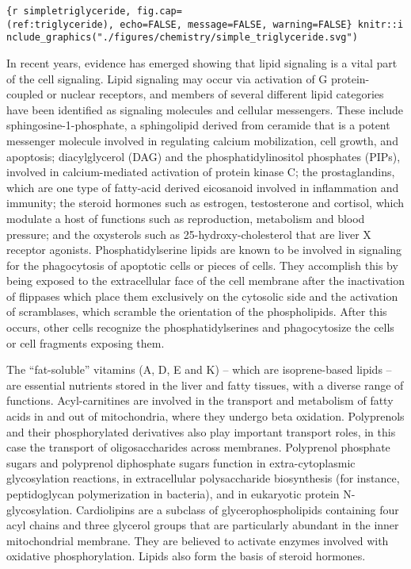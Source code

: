 \texttt{\{r\ simpletriglyceride,\ fig.cap=\textquotesingle{}(ref:triglyceride)\textquotesingle{},\ echo=FALSE,\ message=FALSE,\ warning=FALSE\}\ knitr::include\_graphics("./figures/chemistry/simple\_triglyceride.svg")}

In recent years, evidence has emerged showing that lipid signaling is a
vital part of the cell signaling. Lipid signaling may occur via
activation of G protein-coupled or nuclear receptors, and members of
several different lipid categories have been identified as signaling
molecules and cellular messengers. These include
sphingosine-1-phosphate, a sphingolipid derived from ceramide that is a
potent messenger molecule involved in regulating calcium mobilization,
cell growth, and apoptosis; diacylglycerol (DAG) and the
phosphatidylinositol phosphates (PIPs), involved in calcium-mediated
activation of protein kinase C; the prostaglandins, which are one type
of fatty-acid derived eicosanoid involved in inflammation and immunity;
the steroid hormones such as estrogen, testosterone and cortisol, which
modulate a host of functions such as reproduction, metabolism and blood
pressure; and the oxysterols such as 25-hydroxy-cholesterol that are
liver X receptor agonists. Phosphatidylserine lipids are known to be
involved in signaling for the phagocytosis of apoptotic cells or pieces
of cells. They accomplish this by being exposed to the extracellular
face of the cell membrane after the inactivation of flippases which
place them exclusively on the cytosolic side and the activation of
scramblases, which scramble the orientation of the phospholipids. After
this occurs, other cells recognize the phosphatidylserines and
phagocytosize the cells or cell fragments exposing them.

The ``fat-soluble'' vitamins (A, D, E and K) -- which are isoprene-based
lipids -- are essential nutrients stored in the liver and fatty tissues,
with a diverse range of functions. Acyl-carnitines are involved in the
transport and metabolism of fatty acids in and out of mitochondria,
where they undergo beta oxidation. Polyprenols and their phosphorylated
derivatives also play important transport roles, in this case the
transport of oligosaccharides across membranes. Polyprenol phosphate
sugars and polyprenol diphosphate sugars function in extra-cytoplasmic
glycosylation reactions, in extracellular polysaccharide biosynthesis
(for instance, peptidoglycan polymerization in bacteria), and in
eukaryotic protein N-glycosylation. Cardiolipins are a subclass of
glycerophospholipids containing four acyl chains and three glycerol
groups that are particularly abundant in the inner mitochondrial
membrane. They are believed to activate enzymes involved with oxidative
phosphorylation. Lipids also form the basis of steroid hormones.


